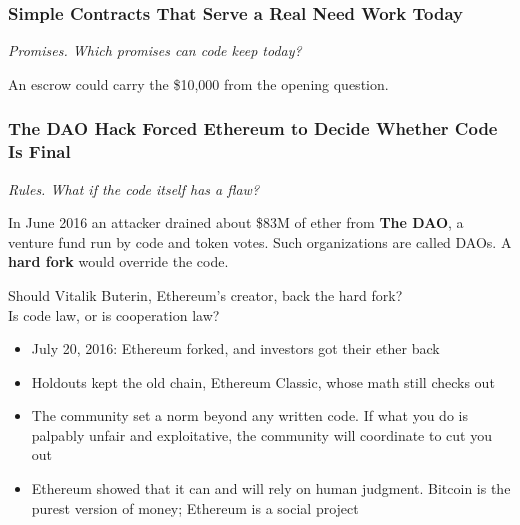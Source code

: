 \documentclass[aspectratio=169]{beamer}
\newcommand{\lead}[1]{{\small\itshape\textcolor{gtnavy!80}{#1}}\par\vspace{1.5mm}}
\newcommand{\bi}{\begin{itemize}}
\newcommand{\ei}{\end{itemize}}
\newcommand{\m}{\item}
\begin{document}
\begin{frame}[label=main-twobytwo]
\frametitle{Simple Contracts That Serve a Real Need Work Today}
\lead{Promises. Which promises can code keep today?}

\begin{center}
\end{center}
\vspace{1mm}
An escrow could carry the \$10,000 from the opening question.
\end{frame}


\begin{frame}[label=main-dao]
\frametitle{The DAO Hack Forced Ethereum to Decide Whether Code Is Final}
\lead{Rules. What if the code itself has a flaw?}

{\small In June 2016 an attacker drained about \$83M of ether from \textbf{The DAO}, a venture fund run by code and token votes. Such organizations are called DAOs. A \textbf{hard fork} would override the code.}
\vspace{2mm}
\begin{center}
{\large Should Vitalik Buterin, Ethereum's creator, back the hard fork?\\[1mm] Is code law, or is cooperation law?}
\end{center}
\pause
\vspace{1mm}
\bi
\small
\m July 20, 2016: Ethereum forked, and investors got their ether back
\m Holdouts kept the old chain, Ethereum Classic, whose math still checks out
\m The community set a norm beyond any written code. If what you do is palpably unfair and exploitative, the community will coordinate to cut you out
\m Ethereum showed that it can and will rely on human judgment. Bitcoin is the purest version of money; Ethereum is a social project
\ei
\par\vspace{0pt plus 1fill}\hfill{\scriptsize \hyperlink{appx-org}{}}
\end{frame}
\end{document}
